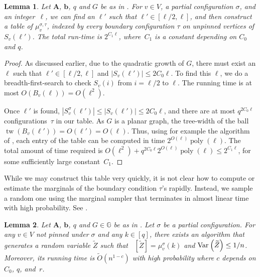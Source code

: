\documentclass[10pt,a4paper]{article}
\newtheorem{lemma}{Lemma}[section]
\newcommand{\tp}[1]{{\left( #1 \right)}}
\newcommand{\Ex}{\mathop{\mathbb{{}E}}\nolimits}
\def\=#1{\mathbb{#1}}
\newcommand{\poly}[1]{\ensuremath{\mathop{\mathrm{poly}}\tp{#1}}}
\newcommand{\abs}[1]{\ensuremath{\left\vert#1\right\vert}}
\newcommand{\Var}[2]{\ensuremath{\textnormal{Var}_{#1}\left(#2\right)}}
\newcommand{\tw}{\operatorname{tw}}
\begin{document}
\begin{lemma}\label{YZ-table}
  Let ${\mathbf{A}}$, ${\mathbf{b}}$, $q$ and $G$ be as in .
  For $v\in V$, a partial configuration $\sigma$, and an integer~$\ell$, 
  we can find an $\ell'$ such that $\ell'\in[\ell/2,\ell]$,
  and then construct a table of $\mu_v^{\sigma,\tau}$, indexed by every boundary configuration $\tau$ on unpinned vertices of $S_v(\ell')$.
  The total run-time is $2^{C_1\ell}$,
  where~$C_1$ is a constant depending on $C_0$ and $q$.
\end{lemma}

\begin{proof}
  As discussed earlier, due to the quadratic growth of $G$,
  there must exist an $\ell$ such that $\ell'\in[\ell/2,\ell]$ and $\abs{S_v(\ell')}\le 2C_0\ell$.
  To find this $\ell$,
  we do a breadth-first-search to check $S_v(i)$ from $i=\ell/2$ to $\ell$.
  The running time is at most $O(B_v(\ell))=O(\ell^2)$.

  Once $\ell'$ is found,
  $\abs{S^{\sigma}_v(\ell')}\le\abs{S_v(\ell')}\le 2C_0\ell$,
  and there are at most $q^{2C_0\ell}$ config\-urations~$\tau$ in our table.
  As $G$ is a planar graph, the tree-width of the ball $\tw(B_v(\ell'))=O(\ell')=O(\ell)$.
  Thus, using for example the algorithm of \cite{YZ13}, each entry of the table can be computed in time $2^{O(\ell)}\poly{\ell}$.
  The total amount of time required is $O(\ell^2)+q^{2C_0\ell}2^{O(\ell)}\poly{\ell}\le 2^{C_1\ell}$,
  for some sufficiently large constant~$C_1$.
\end{proof}

While we may construct this table very quickly,
it is not clear how to compute or estimate the marginals of the boundary condition $\tau$'s rapidly.
Instead, we sample a random one using the marginal sampler \cite{AJ22} that terminates in almost linear time with high probability. 
See . 

\begin{lemma}
	\label{lem:lattice-estimator}
    Let ${\mathbf{A}}$, ${\mathbf{b}}$, $q$ and $G\in\=G$ be as in .
    Let $\sigma$ be a partial configuration.
    For any $v\in V$ not pinned under $\sigma$ and any $k\in[q]$,
    there exists an algorithm that generates a random variable $\widetilde{Z}$ such that $\Ex[\widetilde{Z}]=\mu_{v}^{\sigma}(k)$ and $\Var{}{\widetilde{Z}}\leq1/n$.
    Moreover, its running time is $\widetilde{O}(n^{1-c})$ with high probability where $c$ depends on $C_0$, $q$, and~$r$.
\end{lemma}
\end{document}
